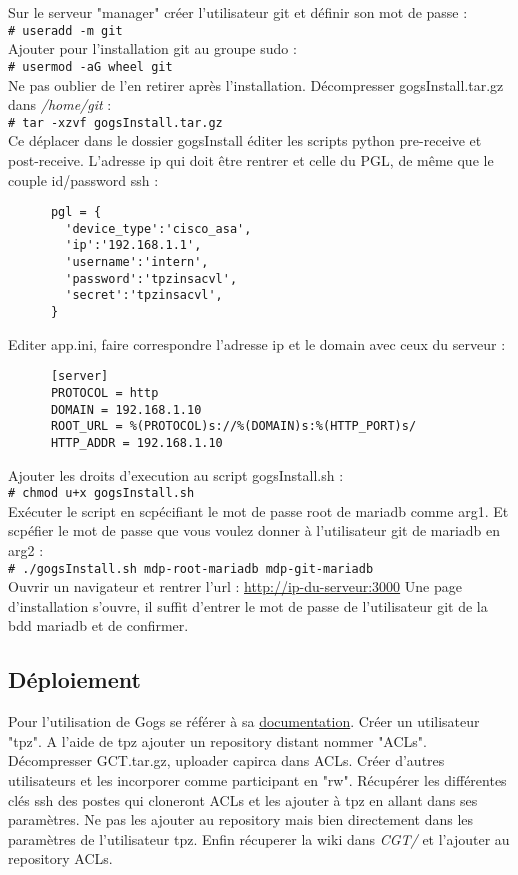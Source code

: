 \documentclass{article}
\newcommand{\shellcmd}[1]{\\\indent\indent\texttt{\footnotesize\# #1}\\}
\begin{document}
      Sur le serveur "manager" créer l'utilisateur git et définir son mot de passe : \shellcmd{useradd -m git}
      Ajouter pour l'installation git au groupe sudo : \shellcmd{usermod -aG wheel git}
      Ne pas oublier de l'en retirer après l'installation. \smallbreak
      \noindent Décompresser gogsInstall.tar.gz dans \textit{/home/git} : \shellcmd{tar -xzvf gogsInstall.tar.gz}
      Ce déplacer dans le dossier gogsInstall éditer les scripts python pre-receive et post-receive.
      L'adresse ip qui doit être rentrer et celle du PGL, de même que le couple id/password ssh :
\begin{verbatim}
      pgl = {
        'device_type':'cisco_asa',
        'ip':'192.168.1.1',
        'username':'intern',
        'password':'tpzinsacvl',
        'secret':'tpzinsacvl',
      }
\end{verbatim}
      Editer app.ini, faire correspondre l'adresse ip et le domain avec ceux du serveur :
\begin{verbatim}
      [server]
      PROTOCOL = http
      DOMAIN = 192.168.1.10
      ROOT_URL = %(PROTOCOL)s://%(DOMAIN)s:%(HTTP_PORT)s/
      HTTP_ADDR = 192.168.1.10
\end{verbatim}
      Ajouter les droits d'execution au script gogsInstall.sh : \shellcmd{chmod u+x gogsInstall.sh}
      Exécuter le script en scpécifiant le mot de passe root de mariadb comme arg1. Et scpéfier le mot de passe que vous voulez donner
      à l'utilisateur git de mariadb en arg2 : \shellcmd{./gogsInstall.sh mdp-root-mariadb mdp-git-mariadb}
      Ouvrir un navigateur et rentrer l'url : \url{http://ip-du-serveur:3000} \smallbreak
      \noindent Une page d'installation s'ouvre, il suffit d'entrer le mot de passe de l'utilisateur git de la bdd mariadb et de confirmer.

    \subsection{Déploiement}

      Pour l'utilisation de Gogs se référer à sa \href{https://gogs.io/docs}{documentation}. \bigbreak
      \noindent Créer un utilisateur "tpz". A l'aide de tpz ajouter un repository distant nommer "ACLs".
      Décompresser GCT.tar.gz, uploader capirca dans ACLs. Créer d'autres utilisateurs et les incorporer comme participant en "rw".
      Récupérer les différentes clés ssh des postes qui cloneront ACLs et les ajouter à tpz en allant dans ses paramètres.
      Ne pas les ajouter au repository mais bien directement dans les paramètres de l'utilisateur tpz.
      Enfin récuperer la wiki dans \textit{CGT/} et l'ajouter au repository ACLs.
\begin{comment}
\texttt{[image: capirca.png]}
\end{comment}
\end{document}
